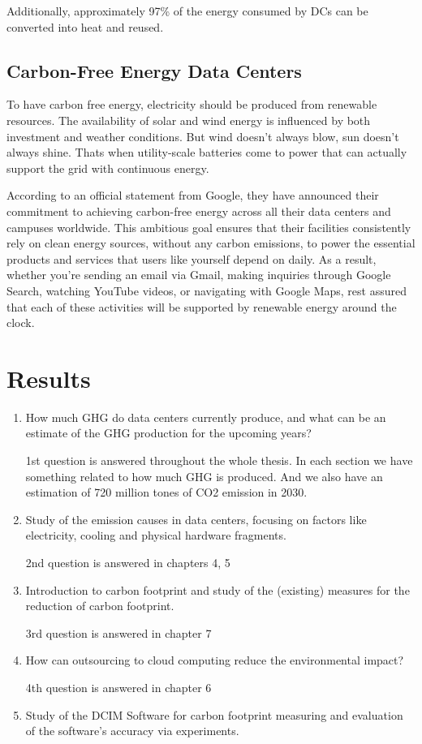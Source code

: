 \documentclass[
  a4paper,  %
  twoside,  %
  bibliography=totoc,
  headsepline,
  cleardoublepage=empty,
  parskip=half,
  draft=false
]{scrbook}
\begin{document}
Additionally, approximately 97\% of the energy consumed by DCs can be converted into heat and reused.

\section{Carbon-Free Energy Data Centers}

To have carbon free energy, electricity should be produced from renewable resources. The availability of solar and wind energy is influenced by both investment and weather conditions. But wind doesn't always blow, sun doesn't always shine. Thats when utility-scale batteries come to power that can actually support the grid with continuous energy.

According to an official statement from Google, they have announced their commitment to achieving carbon-free energy across all their data centers and campuses worldwide. This ambitious goal ensures that their facilities consistently rely on clean energy sources, without any carbon emissions, to power the essential products and services that users like yourself depend on daily. As a result, whether you're sending an email via Gmail, making inquiries through Google Search, watching YouTube videos, or navigating with Google Maps, rest assured that each of these activities will be supported by renewable energy around the clock\cite{google2020thirddecade}.


\chapter{Results}

\begin{enumerate}
	\item How much GHG do data centers currently produce, and what can be an estimate of the GHG production for the upcoming years?
	
	1st question is answered throughout the whole thesis. In each section we have something related to how much GHG is produced. And we also have an estimation of 720 million tones of CO2 emission in 2030.
	
	\item Study of the emission causes in data centers, focusing on factors like electricity, cooling and physical hardware fragments.
	
	2nd question is answered in chapters 4, 5
	
	\item Introduction to carbon footprint and study of the (existing) measures for the reduction of carbon footprint.
	
	3rd question is answered in chapter 7
	
	\item How can outsourcing to cloud computing reduce the environmental impact?
	
	4th question is answered in chapter 6
	
	\item Study of the DCIM Software for carbon footprint measuring and evaluation of the software's accuracy via experiments.
\end{enumerate}
\end{document}
